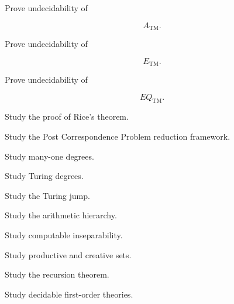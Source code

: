 \begin{exercise}[4]
Prove undecidability of

\[
A_{\mathrm{TM}}.
\]
\end{exercise}

\begin{exercise}[4]
Prove undecidability of

\[
E_{\mathrm{TM}}.
\]
\end{exercise}

\begin{exercise}[4]
Prove undecidability of

\[
EQ_{\mathrm{TM}}.
\]
\end{exercise}

\begin{exercise}[4]
Study the proof of Rice's theorem.
\end{exercise}

\begin{exercise}[4]
Study the Post Correspondence Problem reduction framework.
\end{exercise}

\begin{exercise}[4]
Study many-one degrees.
\end{exercise}

\begin{exercise}[4]
Study Turing degrees.
\end{exercise}

\begin{exercise}[4]
Study the Turing jump.
\end{exercise}

\begin{exercise}[4]
Study the arithmetic hierarchy.
\end{exercise}

\begin{exercise}[4]
Study computable inseparability.
\end{exercise}

\begin{exercise}[4]
Study productive and creative sets.
\end{exercise}

\begin{exercise}[4]
Study the recursion theorem.
\end{exercise}

\begin{exercise}[4]
Study decidable first-order theories.
\end{exercise}

